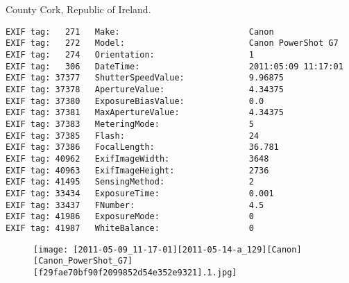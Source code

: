 \section{\protect{}}
\noindent County Cork, Republic of Ireland.
\noindent
\begin{lstlisting}
EXIF tag:   271   Make:                          Canon
EXIF tag:   272   Model:                         Canon PowerShot G7
EXIF tag:   274   Orientation:                   1
EXIF tag:   306   DateTime:                      2011:05:09 11:17:01
EXIF tag: 37377   ShutterSpeedValue:             9.96875
EXIF tag: 37378   ApertureValue:                 4.34375
EXIF tag: 37380   ExposureBiasValue:             0.0
EXIF tag: 37381   MaxApertureValue:              4.34375
EXIF tag: 37383   MeteringMode:                  5
EXIF tag: 37385   Flash:                         24
EXIF tag: 37386   FocalLength:                   36.781
EXIF tag: 40962   ExifImageWidth:                3648
EXIF tag: 40963   ExifImageHeight:               2736
EXIF tag: 41495   SensingMethod:                 2
EXIF tag: 33434   ExposureTime:                  0.001
EXIF tag: 33437   FNumber:                       4.5
EXIF tag: 41986   ExposureMode:                  0
EXIF tag: 41987   WhiteBalance:                  0

\end{lstlisting}
\clearpage
\begin{figure}
\raggedleft
\texttt{[image: [2011-05-09\_11-17-01][2011-05-14-a\_129][Canon][Canon\_PowerShot\_G7][f29fae70bf90f2099852d54e352e9321].1.jpg]}
\end{figure}


\clearpage
